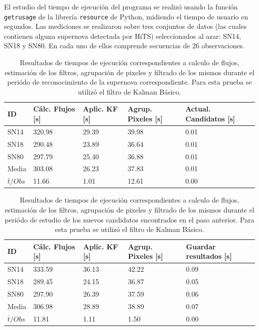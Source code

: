 El estudio del tiempo de ejecuci\'on del programa se realiz\'o usando la funci\'on \texttt{getrusage} de la librer\'ia \texttt{resource} de Python, midiendo el tiempo de usuario en segundos. Las mediciones se realizaron sobre tres conjuntos de datos (las cuales contienen alguna supernova detectada por HiTS) seleccionados al azar: SN14, SN18 y  SN80. En cada uno de ellos comprende secuencias de 26 observaciones. 

\begin{table}[h]
\centering
\begin{tabular}{|l|l|l|l|l|}
\hline
\textbf{ID} & \textbf{C\'alc. Flujos [s]} & \textbf{Aplic. KF [s]} &  \textbf{Agrup. Pixeles [s]}  & \textbf{Actual. Candidatos [s]}\\ \hline \hline
SN14        & 320.98            & 29.39        &  39.98 & 0.01 \\ \hline
SN18            & 290.48             & 23.89         &  36.64  & 0.01\\ \hline
SN80            & 297.79             & 25.40         &   36.88 & 0.01 \\ \hline \hline
Media & 303.08 &  26.23 & 37.83 & 0.01\\\hline 
$\bar{t}/Obs$ & 11.66 &  1.01 & 12.61 & 0.00\\\hline 
\end{tabular}
\label{tab:t1}
\caption{Resultados de tiempos de ejecuci\'on correspondientes a calculo de flujos, estimaci\'on de los filtros, agrupaci\'on de pixeles y filtrado de los mismos durante el peri\'odo de reconocimiento de la supernova correspondiente. Para esta prueba se utiliz\'o el filtro de Kalman B\'asico.}
\end{table}

\begin{table}[h]
\centering
\begin{tabular}{|l|l|l|l|l|}
\hline
\textbf{ID} & \textbf{C\'alc. Flujos [s]} & \textbf{Aplic. KF [s]} &  \textbf{Agrup. Pixeles [s]}  & \textbf{Guardar resultados [s]}\\ \hline \hline
SN14        & 333.59            & 36.13        &  42.22 & 0.09 \\ \hline
SN18            & 289.45             & 24.15         &  36.87  & 0.05\\ \hline
SN80            & 297.90             & 26.39         &   37.59 & 0.06 \\ \hline\hline 
Media & 306.98 &  28.89 & 38.89  & 0.07\\\hline 
$\bar{t}/Obs$ & 11.81 &  1.11 & 1.50 & 0.00\\\hline 
\end{tabular}
\label{tab:t2}
\caption{Resultados de tiempos de ejecuci\'on correspondientes a calculo de flujos, estimaci\'on de los filtros, agrupaci\'on de pixeles y filtrado de los mismos durante el peri\'odo de estudio de los nuevos candidatos encontrados en el paso anterior. Para esta prueba se utiliz\'o el filtro de Kalman B\'asico.}
\end{table}


